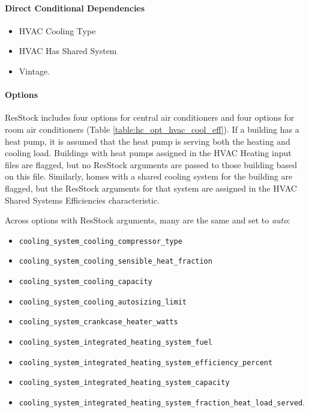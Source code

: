 \paragraph{Direct Conditional Dependencies}
\begin{itemize}
    \item HVAC Cooling Type
    \item HVAC Has Shared System
    \item Vintage.
\end{itemize}

\paragraph{Options}
ResStock includes four options for central air conditioners and four options for room air conditioners (Table \ref{table:hc_opt_hvac_cool_eff}). If a building has a heat pump, it is assumed that the heat pump is serving both the heating and cooling load. Buildings with heat pumps assigned in the HVAC Heating input files are flagged, but no ResStock arguments are passed to those building based on this file. Similarly, homes with a shared cooling system for the building are flagged, but the ResStock arguments for that system are assigned in the HVAC Shared Systems Efficiencies characteristic. 

Across options with ResStock arguments, many are the same and set to \textit{auto}:
\begin{itemize}
    \item \texttt{cooling\_system\_cooling\_compressor\_type} 
    \item \texttt{cooling\_system\_cooling\_sensible\_heat\_fraction}
    \item \texttt{cooling\_system\_cooling\_capacity} 
    \item \texttt{cooling\_system\_cooling\_autosizing\_limit} 
    \item \texttt{cooling\_system\_crankcase\_heater\_watts}
    \item \texttt{cooling\_system\_integrated\_heating\_system\_fuel}
    \item \texttt{cooling\_system\_integrated\_heating\_system\_efficiency\_percent}
    \item \texttt{cooling\_system\_integrated\_heating\_system\_capacity} 
    \item \texttt{cooling\_system\_integrated\_heating\_system\_fraction\_heat\_load\_served}. 
\end{itemize}

